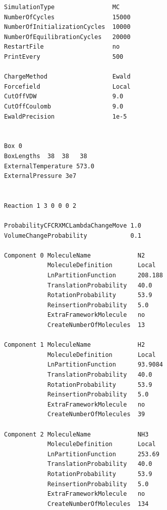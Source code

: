 \begin{verbatim}
SimulationType                MC
NumberOfCycles                15000
NumberOfInitializationCycles  10000
NumberOfEquilibrationCycles   20000
RestartFile                   no
PrintEvery                    500

ChargeMethod                  Ewald
Forcefield                    Local
CutOffVDW                     9.0
CutOffCoulomb                 9.0
EwaldPrecision                1e-5


Box 0
BoxLengths  38  38   38
ExternalTemperature 573.0
ExternalPressure 3e7


Reaction 1 3 0 0 0 2

ProbabilityCFCRXMCLambdaChangeMove 1.0
VolumeChangeProbability            0.1

Component 0 MoleculeName             N2
            MoleculeDefinition       Local
            LnPartitionFunction      208.188
            TranslationProbability   40.0
            RotationProbability      53.9
            ReinsertionProbability   5.0
            ExtraFrameworkMolecule   no
            CreateNumberOfMolecules  13

Component 1 MoleculeName             H2
            MoleculeDefinition       Local
            LnPartitionFunction      93.9084
            TranslationProbability   40.0
            RotationProbability      53.9
            ReinsertionProbability   5.0
            ExtraFrameworkMolecule   no
            CreateNumberOfMolecules  39

Component 2 MoleculeName             NH3
            MoleculeDefinition       Local
            LnPartitionFunction      253.69
            TranslationProbability   40.0
            RotationProbability      53.9
            ReinsertionProbability   5.0
            ExtraFrameworkMolecule   no
            CreateNumberOfMolecules  134
\end{verbatim}


